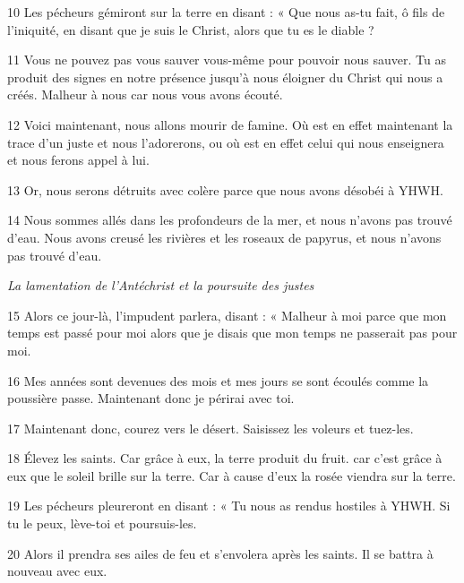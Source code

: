 \par 10 Les pécheurs gémiront sur la terre en disant : « Que nous as-tu fait, ô fils de l'iniquité, en disant que je suis le Christ, alors que tu es le diable ?

\par 11 Vous ne pouvez pas vous sauver vous-même pour pouvoir nous sauver. Tu as produit des signes en notre présence jusqu'à nous éloigner du Christ qui nous a créés. Malheur à nous car nous vous avons écouté.

\par 12 Voici maintenant, nous allons mourir de famine. Où est en effet maintenant la trace d'un juste et nous l'adorerons, ou où est en effet celui qui nous enseignera et nous ferons appel à lui.

\par 13 Or, nous serons détruits avec colère parce que nous avons désobéi à YHWH.

\par 14 Nous sommes allés dans les profondeurs de la mer, et nous n'avons pas trouvé d'eau. Nous avons creusé les rivières et les roseaux de papyrus, et nous n’avons pas trouvé d’eau.


\par \textit{La lamentation de l'Antéchrist et la poursuite des justes}


\par 15 Alors ce jour-là, l'impudent parlera, disant : « Malheur à moi parce que mon temps est passé pour moi alors que je disais que mon temps ne passerait pas pour moi.

\par 16 Mes années sont devenues des mois et mes jours se sont écoulés comme la poussière passe. Maintenant donc je périrai avec toi.

\par 17 Maintenant donc, courez vers le désert. Saisissez les voleurs et tuez-les.

\par 18 Élevez les saints. Car grâce à eux, la terre produit du fruit. car c'est grâce à eux que le soleil brille sur la terre. Car à cause d’eux la rosée viendra sur la terre.

\par 19 Les pécheurs pleureront en disant : « Tu nous as rendus hostiles à YHWH. Si tu le peux, lève-toi et poursuis-les.

\par 20 Alors il prendra ses ailes de feu et s'envolera après les saints. Il se battra à nouveau avec eux.

